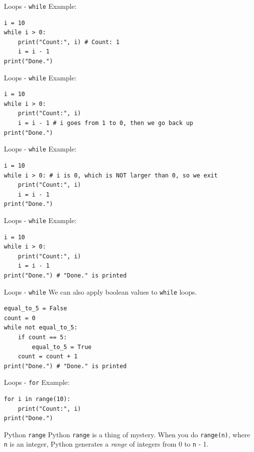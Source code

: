 \documentclass[dvipsnames, svgnames, x11names]{beamer}
\begin{document}
\addtocounter{framenumber}{-1}

\begin{frame}[fragile]{Loops - \texttt{while}}
Example:
\begin{verbatim}
i = 10
while i > 0: 
    print("Count:", i) # Count: 1
    i = i - 1
print("Done.")
\end{verbatim}
\end{frame}

\addtocounter{framenumber}{-1}

\begin{frame}[fragile]{Loops - \texttt{while}}
Example:
\begin{verbatim}
i = 10
while i > 0: 
    print("Count:", i)
    i = i - 1 # i goes from 1 to 0, then we go back up
print("Done.")
\end{verbatim}
\end{frame}

\addtocounter{framenumber}{-1}

\begin{frame}[fragile]{Loops - \texttt{while}}
Example:
\begin{verbatim}
i = 10
while i > 0: # i is 0, which is NOT larger than 0, so we exit
    print("Count:", i)
    i = i - 1
print("Done.")
\end{verbatim}
\end{frame}

\addtocounter{framenumber}{-1}

\begin{frame}[fragile]{Loops - \texttt{while}}
Example:
\begin{verbatim}
i = 10
while i > 0:
    print("Count:", i)
    i = i - 1
print("Done.") # "Done." is printed
\end{verbatim}
\end{frame}

\begin{frame}[fragile]{Loops - \texttt{while}}
We can also apply boolean values to \texttt{while} loops.
\begin{verbatim}
equal_to_5 = False
count = 0
while not equal_to_5:
    if count == 5:
        equal_to_5 = True
    count = count + 1
print("Done.") # "Done." is printed
\end{verbatim}
\end{frame}

\begin{frame}[fragile]{Loops - \texttt{for}}
Example:
\begin{verbatim}
for i in range(10):
    print("Count:", i)
print("Done.")
\end{verbatim}
\begin{block}{Python \texttt{range}}
Python \texttt{range} is a thing of mystery. When you do \texttt{range(n)}, where \texttt{n} is an integer, Python generates a \textit{range} of integers from 0 to \texttt{n} - 1.
\end{block}
\end{frame}
\end{document}
